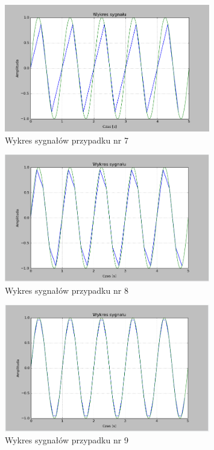 \documentclass{article}
\begin{document}
    \begin{figure}[h!]
        \centering
        \includegraphics[width=0.8\textwidth]{img/1/foh3.png}
        \caption{Wykres sygnałów przypadku nr 7}
    \end{figure}
    \FloatBarrier

    \begin{figure}[h!]
        \centering
        \includegraphics[width=0.8\textwidth]{img/1/foh5.png}
        \caption{Wykres sygnałów przypadku nr 8}
    \end{figure}
    \FloatBarrier

    \begin{figure}[h!]
        \centering
        \includegraphics[width=0.8\textwidth]{img/1/foh10.png}
        \caption{Wykres sygnałów przypadku nr 9}
    \end{figure}
    \FloatBarrier
\end{document}
